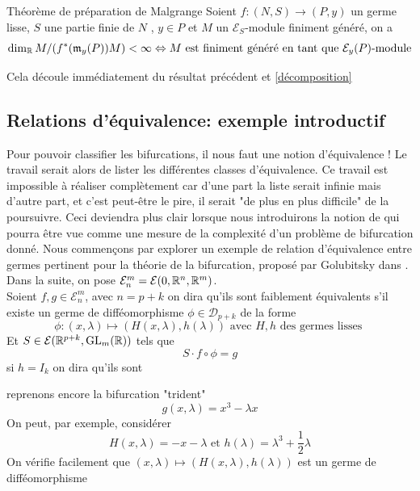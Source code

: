 \documentclass[memoire.tex]{subfiles}
\begin{document}
\begin{theobox}{Théorème de préparation de Malgrange}{}
Soient $f:(N,S)\rightarrow (P,y)$ un germe  lisse, $S$ une partie finie de $N$ , $y\in P$ et $M$ un $\mathcal{E}_S$-module finiment généré, on a 
\begin{equation*}
    \dim_{\mathbb{R}} M/(f^{*}(\mathfrak{m}_y(P))M)< 
    \infty\Leftrightarrow M \text{ est finiment généré en tant que $\mathcal{E}_y(P)$-module}
\end{equation*}
\end{theobox}
\begin{preuve}
    Cela découle immédiatement du résultat précédent et \ref{décomposition} 
\end{preuve}

\subsection{Relations d'équivalence: exemple introductif} 
Pour pouvoir classifier les bifurcations, il nous faut une notion d'équivalence  ! Le travail serait alors de lister les différentes classes d'équivalence. Ce travail est impossible à réaliser complètement car d'une part la liste serait infinie mais d'autre part, et c'est peut-être le pire, il serait "de plus en plus difficile" de la poursuivre. Ceci deviendra plus clair lorsque nous introduirons la notion de  qui pourra être vue comme une mesure de la complexité d'un problème de bifurcation donné. Nous commençons par explorer un exemple de relation d'équivalence  entre germes pertinent pour la théorie de la bifurcation, proposé par Golubitsky dans \cite{golubitsky1985sgb1}. Dans la suite, on pose $\mathcal{E}^m_{n}=\mathcal{E}(0,\mathbb{R}^{n},\mathbb{R}^m)$.\\
Soient $f,g\in\mathcal{E}^m_n$, avec $n=p+k$ on dira qu'ils sont 
faiblement équivalents s'il existe un germe  de difféomorphisme $\phi\in\mathcal{D}_{p+k}$ de la forme 
\begin{equation*}
     \phi :(x,\lambda)\mapsto (H(x,\lambda),h(\lambda))\text{ avec }H,h\text{ des germes lisses }
\end{equation*}
Et $S\in\mathcal{E}(\mathbb{R}^{p+k},\operatorname*{GL}_m(\mathbb{R}))$ tels que
\begin{equation}\label{GolubEQ}
    S\cdot f\circ\phi=  g
\end{equation}
 si $h=I_k$ on dira qu'ils sont 
\begin{exemple}
    reprenons encore la bifurcation "trident"
    \begin{equation*}
        g(x,\lambda)=x^3-\lambda x
    \end{equation*}
    On peut, par exemple, considérer
    \begin{equation*}
        H(x,\lambda)=-x-\lambda\text{ et } h(\lambda)=\lambda^3+\frac{1}{2}\lambda
    \end{equation*}
    On vérifie facilement que $(x,\lambda)\mapsto (H(x,\lambda),h(\lambda))$ est un germe  de difféomorphisme
\end{exemple}
\end{document}

